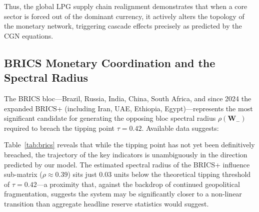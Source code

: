 \documentclass[12pt, letterpaper]{article}
\theoremstyle{definition}
\begin{document}
Thus, the global LPG supply chain realignment demonstrates that when a core sector is forced out of the dominant currency, it actively alters the topology of the monetary network, triggering cascade effects precisely as predicted by the CGN equations.

\subsection{BRICS Monetary Coordination and the Spectral Radius}
The BRICS bloc---Brazil, Russia, India, China, South Africa, and since 2024 the expanded BRICS+ (including Iran, UAE, Ethiopia, Egypt)---represents the most significant candidate for generating the opposing bloc spectral radius $\rho(\mathbf{W}_-)$ required to breach the tipping point $\tau = 0.42$. Available data suggests:

\begin{table}[H]
\centering
\caption{BRICS+ Network Density Indicators and CGN Tipping Point Progress, 2024}
\label{tab:brics}
\end{table}

Table~\ref{tab:brics} reveals that while the tipping point has not yet been definitively breached, the trajectory of the key indicators is unambiguously in the direction predicted by our model. The estimated spectral radius of the BRICS+ influence sub-matrix ($\rho \approx 0.39$) sits just 0.03 units below the theoretical tipping threshold of $\tau = 0.42$---a proximity that, against the backdrop of continued geopolitical fragmentation, suggests the system may be significantly closer to a non-linear transition than aggregate headline reserve statistics would suggest.
\end{document}
